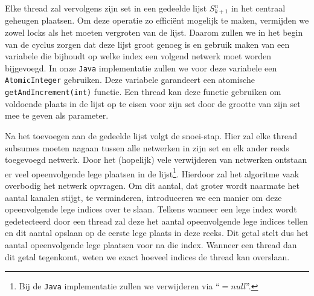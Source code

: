 \documentclass{article}
\begin{document}
Elke thread zal vervolgens zijn set in een gedeelde lijst $S^n_{k+1}$ in het centraal geheugen plaatsen.
Om deze operatie zo effici\"ent mogelijk te maken, vermijden we zowel locks als het moeten vergroten van de lijst. 
Daarom zullen we in het begin van de cyclus zorgen dat deze lijst groot genoeg is en gebruik maken van een variabele die bijhoudt op welke index een volgend netwerk moet worden bijgevoegd.
In onze \texttt{Java} implementatie zullen we voor deze variabele een \texttt{AtomicInteger} gebruiken.
Deze variabele garandeert een atomische \texttt{getAndIncrement(int)} functie.
Een thread kan deze functie gebruiken om voldoende plaats in de lijst op te eisen voor zijn set door de grootte van zijn set mee te geven als parameter.

Na het toevoegen aan de gedeelde lijst volgt de snoei-stap. Hier zal elke thread subsumes moeten nagaan tussen alle netwerken in zijn set en elk ander reeds toegevoegd netwerk.
Door het (hopelijk) vele verwijderen van netwerken ontstaan er veel opeenvolgende lege plaatsen in de lijst\footnote{Bij de \texttt{Java} implementatie zullen we verwijderen via  ``${= null}$''.}.
Hierdoor zal het algoritme vaak overbodig het netwerk opvragen.
Om dit aantal, dat groter wordt naarmate het aantal kanalen stijgt, te verminderen, introduceren we een manier om deze opeenvolgende lege indices over te slaan. 
Telkens wanneer een lege index wordt gedetecteerd door een thread zal deze het aantal opeenvolgende lege indices tellen en dit aantal opslaan op de eerste lege plaats in deze reeks.
Dit getal stelt dus het aantal opeenvolgende lege plaatsen voor na die index.
Wanneer een thread dan dit getal tegenkomt, weten we exact hoeveel indices de thread kan overslaan.
\end{document}
